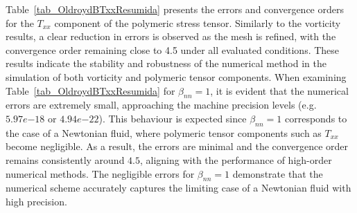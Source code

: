 \documentclass[preprint, 12pt]{elsarticle}
\begin{document}
Table~\ref{tab_OldroydBTxxResumida} presents the errors and convergence orders for the $T_{xx}$ component of the polymeric stress tensor. Similarly to the vorticity results, a clear reduction in errors is observed as the mesh is refined, with the convergence order remaining close to 4.5 under all evaluated conditions. These results indicate the stability and robustness of the numerical method in the simulation of both vorticity and polymeric tensor components. When examining Table~\ref{tab_OldroydBTxxResumida} for $\beta_{nn} = 1$, it is evident that the numerical errors are extremely small, approaching the machine precision levels (e.g. $5.97e{-18}$ or $4.94e{-22}$). This behaviour is expected since $\beta_{nn} = 1$ corresponds to the case of a Newtonian fluid, where polymeric tensor components such as $T_{xx}$ become negligible. As a result, the errors are minimal and the convergence order remains consistently around $4.5$, aligning with the performance of high-order numerical methods. The negligible errors for $\beta_{nn} = 1$ demonstrate that the numerical scheme accurately captures the limiting case of a Newtonian fluid with high precision.
\end{document}
